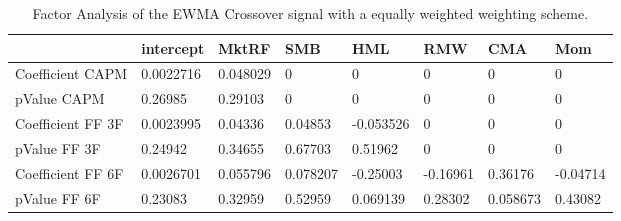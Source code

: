 \begin{table}[H]
\centering
\begin{tabular}{llllllll}
& intercept & MktRF & SMB & HML & RMW & CMA & Mom \\ 
\hline 
Coefficient CAPM & 0.0022716 & 0.048029 & 0 & 0 & 0 & 0 & 0 \\ 
pValue CAPM & 0.26985 & 0.29103 & 0 & 0 & 0 & 0 & 0 \\ 
Coefficient FF 3F & 0.0023995 & 0.04336 & 0.04853 & -0.053526 & 0 & 0 & 0 \\ 
pValue FF 3F & 0.24942 & 0.34655 & 0.67703 & 0.51962 & 0 & 0 & 0 \\ 
Coefficient FF 6F & 0.0026701 & 0.055796 & 0.078207 & -0.25003 & -0.16961 & 0.36176 & -0.04714 \\ 
pValue FF 6F & 0.23083 & 0.32959 & 0.52959 & 0.069139 & 0.28302 & 0.058673 & 0.43082 \\ 
\hline
\end{tabular}
\caption{Factor Analysis of the EWMA Crossover signal with a equally weighted weighting scheme.}
\label{MBBSEW_FACTOR}
\end{table}